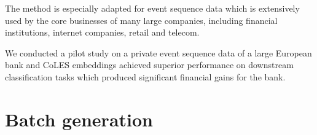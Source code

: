 \documentclass[sigconf]{acmart}
\begin{document}
The method is especially adapted for event sequence data which is extensively used by the core businesses of many large companies, including financial institutions, internet companies, retail and telecom.

We conducted a pilot study on a private event sequence data of a large European bank and CoLES embeddings achieved superior performance on downstream classification tasks which produced significant financial gains for the bank.










\newpage
\appendix

\section{Batch generation} \label{app-sec-bg}
\end{document}
